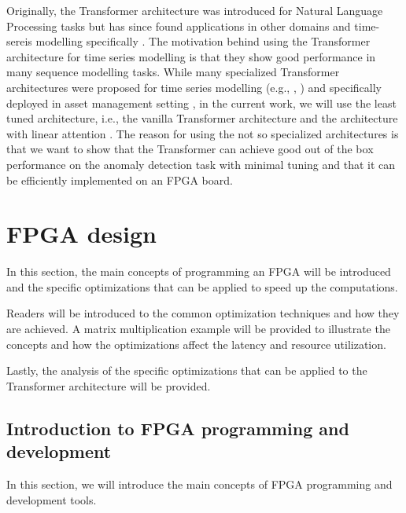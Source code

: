\documentclass[a4paper, twoside]{report}
\theoremstyle{definition}
\numberwithin{equation}{section}
\begin{document}
Originally, the Transformer architecture was introduced for Natural Language Processing tasks \cite{1706.03762}
but has since found applications in other domains and time-sereis modelling specifically \cite{2202.07125}.
The motivation behind using the Transformer architecture for time series modelling is that
they show good performance in many sequence modelling tasks. While many
specialized Transformer architectures were proposed for time series modelling
(e.g., \cite{tuli2022tranad}, \cite{2205.13504}) and specifically deployed in
asset management setting \cite{Lezmi2023TimeSF},
in the current work, we will use the least tuned architecture, i.e., the vanilla Transformer architecture
and the architecture with linear attention \cite{2006.16236}. The reason for
using the not so specialized architectures is that we want to show that the Transformer
can achieve good out of the box performance on the anomaly detection task with minimal
tuning and that it can be efficiently implemented on an FPGA board.

\chapter{FPGA design} \label{sec:fpga_design}

In this section, the main concepts of programming an FPGA will be introduced
and the specific optimizations that can be applied to speed up the
computations.

Readers will be introduced to the common optimization techniques and how they
are achieved. A matrix multiplication example will be provided to illustrate the concepts and
how the optimizations affect the latency and resource utilization.

Lastly, the analysis of the specific optimizations that can be applied to the Transformer architecture
will be provided.

\section{Introduction to FPGA programming and development} \label{sec:fpga_development}

In this section, we will introduce the main concepts of FPGA programming and development tools.

\end{document}
